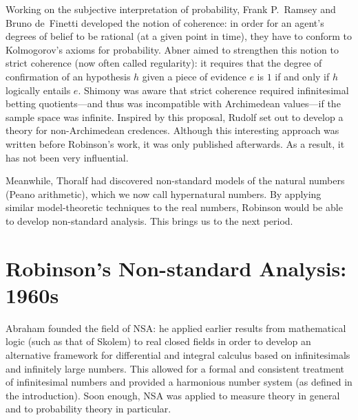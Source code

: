 Working on the subjective interpretation of probability, Frank P.\ Ramsey and Bruno de~Finetti developed the notion of coherence: in order for an agent's degrees of belief to be rational (at a given point in time), they have to conform to Kolmogorov's axioms for probability. Abner \citet{Shimony:1955} aimed to strengthen this notion to strict coherence (now often called regularity): it requires that the degree of confirmation of an hypothesis $h$ given a piece of evidence $e$ is $1$ if and only if $h$ logically entails $e$. Shimony was aware that strict coherence required infinitesimal betting quotients---and thus was incompatible with Archimedean values---if the sample space was infinite. Inspired by this proposal, Rudolf \citet{Carnap:1980} set out to develop a theory for non-Archimedean credences. Although this interesting approach was written before Robinson's work, it was only published afterwards. As a result, it has not been very influential.

Meanwhile, Thoralf \citet{Skolem:1934} had discovered non-standard models of the natural numbers (Peano arithmetic), which we now call hypernatural numbers. By applying similar model-theoretic techniques to the real numbers, Robinson would be able to develop non-standard analysis. This brings us to the next period.

\section{Robinson's Non-standard Analysis: 1960s}
Abraham \citet{Robinson:1961,Robinson:1966} founded the field of NSA: he applied earlier results from mathematical logic (such as that of Skolem) to real closed fields in order to develop an alternative framework for differential and integral calculus based on infinitesimals and infinitely large numbers. This allowed for a formal and consistent treatment of infinitesimal numbers and provided a harmonious number system (as defined in the introduction). Soon enough, NSA was applied to measure theory in general and to probability theory in particular.

